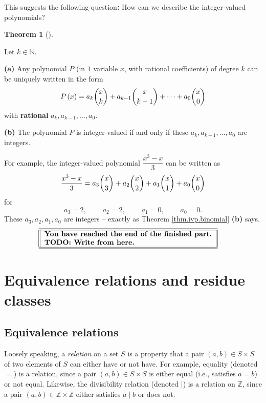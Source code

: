 \documentclass[numbers=enddot,12pt,final,onecolumn,notitlepage]{scrartcl}%
\numberwithin{exer}{subsection}
\theoremstyle{definition}
\newtheorem{theo}{Theorem}[subsection]
\newenvironment{theorem}[1][]
{\begin{theo}[#1]\begin{leftbar}}
{\end{leftbar}\end{theo}}
\begin{document}
This suggests the following question\textbf{:} How can we describe the
integer-valued polynomials?

\begin{theorem}
\label{thm.ivp.binomial}Let $k\in\mathbb{N}$.

\textbf{(a)} Any polynomial $P$ (in $1$ variable $x$, with rational
coefficients) of degree $k$ can be uniquely written in the form%
\[
P\left(  x\right)  =a_{k}\dbinom{x}{k}+a_{k-1}\dbinom{x}{k-1}+\cdots
+a_{0}\dbinom{x}{0}%
\]
with \textbf{rational} $a_{k},a_{k-1},\ldots,a_{0}$.

\textbf{(b)} The polynomial $P$ is integer-valued if and only if these
$a_{k},a_{k-1},\ldots,a_{0}$ are integers.
\end{theorem}

For example, the integer-valued polynomial $\dfrac{x^{3}-x}{3}$ can be written
as%
\[
\dfrac{x^{3}-x}{3}=a_{3}\dbinom{x}{3}+a_{2}\dbinom{x}{2}+a_{1}\dbinom{x}%
{1}+a_{0}\dbinom{x}{0}%
\]
for
\[
a_{3}=2,\ \ \ \ \ \ \ \ \ \ a_{2}=2,\ \ \ \ \ \ \ \ \ \ a_{1}%
=0,\ \ \ \ \ \ \ \ \ \ a_{0}=0.
\]
These $a_{3},a_{2},a_{1},a_{0}$ are integers -- exactly as Theorem
\ref{thm.ivp.binomial} \textbf{(b)} says.%
\[%
\begin{tabular}
[c]{||l||}\hline\hline
\textbf{You have reached the end of the finished part.}\\
\textbf{TODO: Write from here.}\\\hline\hline
\end{tabular}
\ \ \ \
\]


\section{Equivalence relations and residue classes}

\subsection{Equivalence relations}

Loosely speaking, a \textit{relation} on a set $S$ is a property that a pair
$\left(  a,b\right)  \in S\times S$ of two elements of $S$ can either have or
not have. For example, equality (denoted $=$) is a relation, since a pair
$\left(  a,b\right)  \in S\times S$ is either equal (i.e., satisfies $a=b$) or
not equal. Likewise, the divisibility relation (denoted $\mid$) is a relation
on $\mathbb{Z}$, since a pair $\left(  a,b\right)  \in\mathbb{Z}%
\times\mathbb{Z}$ either satisfies $a\mid b$ or does not.
\end{document}

